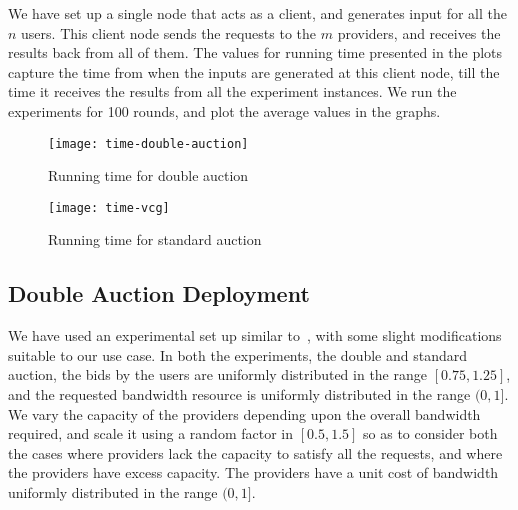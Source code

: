 We have set up a single node that acts as a client, and generates input for all the $n$ users.
This client node sends the requests to the $m$ providers, and receives the results back from all of them.
The values for running time presented in the plots capture the time from when the inputs are generated at this client node,
till the time it receives the results from all the experiment instances.
We run the experiments for 100 rounds, and plot the average values in the graphs.

\begin{figure*}[tbp]
	\centering
	\begin{minipage}[c]{0.48\linewidth}
		\centering
		\texttt{[image: time-double-auction]}
		\caption{Running time for double auction}
		\label{fig:double-auction-time}
	\end{minipage}
	\quad
	\begin{minipage}[c]{0.48\linewidth}
		\centering
		\texttt{[image: time-vcg]}
		\caption{Running time for standard auction}
		\label{fig:standard-auction-time}
	\end{minipage}	
\end{figure*}

\subsection{Double Auction Deployment}

We have used an experimental set up similar to~\cite{Zheng2014Star}, with some slight modifications suitable to our use case.
In both the experiments, the double and standard auction, 
the bids by the users are uniformly distributed in the range $[0.75, 1.25]$,
and the requested bandwidth resource is uniformly distributed in the range $(0, 1]$.
We vary the capacity of the providers depending upon the overall bandwidth required, and scale it using a random factor in $[0.5, 1.5]$ so as to consider both the cases where providers lack the capacity to satisfy all the requests, and where the providers have excess capacity.
The providers have a unit cost of bandwidth uniformly distributed in the range $(0, 1]$.


